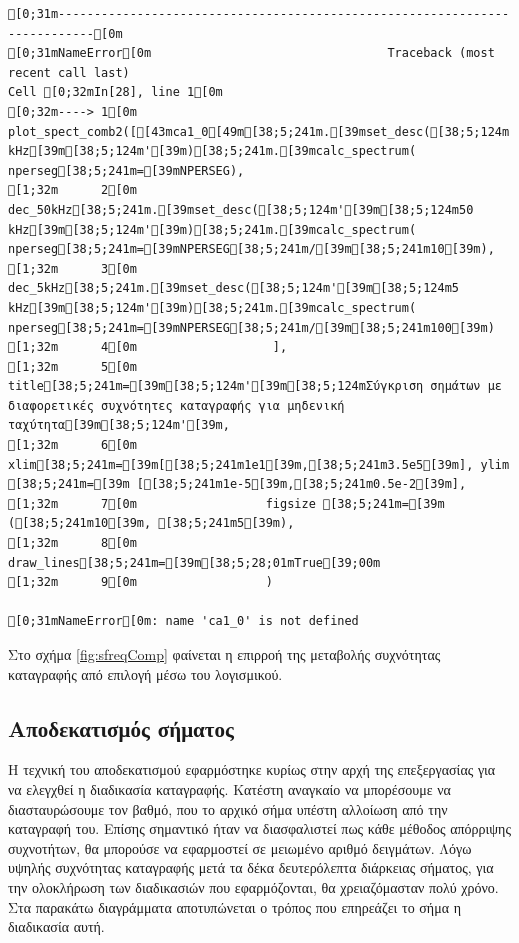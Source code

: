 \documentclass[11pt]{article}
\begin{document}
\label{fig:sfreqComp}
\begin{verbatim}
[0;31m---------------------------------------------------------------------------[0m
[0;31mNameError[0m                                 Traceback (most recent call last)
Cell [0;32mIn[28], line 1[0m
[0;32m----> 1[0m plot_spect_comb2([[43mca1_0[49m[38;5;241m.[39mset_desc([38;5;124m'[39m[38;5;124m500 kHz[39m[38;5;124m'[39m)[38;5;241m.[39mcalc_spectrum( nperseg[38;5;241m=[39mNPERSEG),
[1;32m      2[0m                   dec_50kHz[38;5;241m.[39mset_desc([38;5;124m'[39m[38;5;124m50 kHz[39m[38;5;124m'[39m)[38;5;241m.[39mcalc_spectrum( nperseg[38;5;241m=[39mNPERSEG[38;5;241m/[39m[38;5;241m10[39m),
[1;32m      3[0m                   dec_5kHz[38;5;241m.[39mset_desc([38;5;124m'[39m[38;5;124m5 kHz[39m[38;5;124m'[39m)[38;5;241m.[39mcalc_spectrum( nperseg[38;5;241m=[39mNPERSEG[38;5;241m/[39m[38;5;241m100[39m)
[1;32m      4[0m                   ],
[1;32m      5[0m                  title[38;5;241m=[39m[38;5;124m'[39m[38;5;124mΣύγκριση σημάτων με διαφορετικές συχνότητες καταγραφής για μηδενική ταχύτητα[39m[38;5;124m'[39m,
[1;32m      6[0m                  xlim[38;5;241m=[39m[[38;5;241m1e1[39m,[38;5;241m3.5e5[39m], ylim [38;5;241m=[39m [[38;5;241m1e-5[39m,[38;5;241m0.5e-2[39m],
[1;32m      7[0m                  figsize [38;5;241m=[39m ([38;5;241m10[39m, [38;5;241m5[39m),
[1;32m      8[0m                  draw_lines[38;5;241m=[39m[38;5;28;01mTrue[39;00m
[1;32m      9[0m                  )

[0;31mNameError[0m: name 'ca1_0' is not defined
\end{verbatim}

Στο σχήμα \ref{fig:sfreqComp} φαίνεται η επιρροή της μεταβολής συχνότητας καταγραφής
από επιλογή μέσω του λογισμικού.
\subsection{Αποδεκατισμός σήματος}
\label{sec:org2fcad68}
\label{sec:decimation-chapter}
Η τεχνική του αποδεκατισμού εφαρμόστηκε κυρίως στην αρχή της επεξεργασίας
για να ελεγχθεί η διαδικασία καταγραφής. Κατέστη αναγκαίο να μπορέσουμε
να διασταυρώσουμε τον βαθμό, που το αρχικό σήμα υπέστη αλλοίωση από την
καταγραφή του. Επίσης σημαντικό ήταν να διασφαλιστεί πως κάθε μέθοδος
απόρριψης συχνοτήτων, θα μπορούσε να εφαρμοστεί σε μειωμένο αριθμό
δειγμάτων. Λόγω υψηλής συχνότητας καταγραφής μετά τα δέκα δευτερόλεπτα
διάρκειας σήματος, για την ολοκλήρωση των διαδικασιών που εφαρμόζονται, θα
χρειαζόμασταν πολύ χρόνο. Στα παρακάτω διαγράμματα αποτυπώνεται ο τρόπος
που επηρεάζει το σήμα η διαδικασία αυτή.
\end{document}
